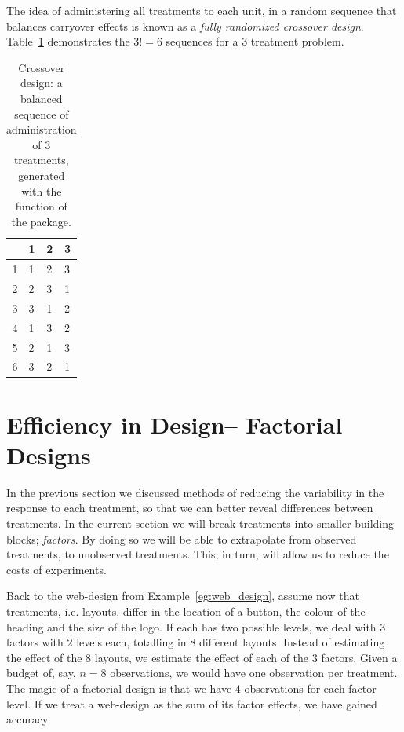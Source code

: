 The idea of administering all treatments to each unit, in a random sequence that balances carryover effects is known as a \emph{fully randomized crossover design}. 
Table~\ref{tab:crossover} demonstrates the $3!=6$ sequences for a $3$ treatment problem.
\begin{table}[ht]
\centering
\begin{tabular}{rlll}
  \hline
 & 1 & 2 & 3 \\ 
  \hline
1 & 1 & 2 & 3 \\ 
  2 & 2 & 3 & 1 \\ 
  3 & 3 & 1 & 2 \\ 
  4 & 1 & 3 & 2 \\ 
  5 & 2 & 1 & 3 \\ 
  6 & 3 & 2 & 1 \\ 
   \hline
\end{tabular}
\caption[Crossover Design]{Crossover design: a balanced sequence of administration of $3$ treatments, generated with the  function of the  \R package. }
\label{tab:crossover}
\end{table}









\section{Efficiency in Design-- Factorial Designs}
\label{sec:factorial_design}

In the previous section we discussed methods of reducing the variability in the response to each treatment, so that we can better reveal differences between treatments. 
In the current section we will break treatments into smaller building blocks; \emph{factors}.
By doing so we will be able to extrapolate from observed treatments, to unobserved treatments. This, in turn, will allow us to reduce the costs of experiments.


\begin{example}
\label{eg:web_design_II}
Back to the web-design from Example~\ref{eg:web_design}, assume now that treatments, i.e. layouts, differ in the location of a button, the colour of the heading and the size of the logo. 
If each has two possible levels, we deal with $3$ factors with $2$ levels each, totalling in $8$ different layouts. 
Instead of estimating the effect of the $8$ layouts, we estimate the effect of each of the $3$ factors. 
Given a budget of, say, $n=8$ observations, we would have one observation per treatment. 
The magic of a factorial design is that we have $4$ observations for each factor level.
If we treat a web-design as the sum of its factor effects, we have gained accuracy 
\end{example}

